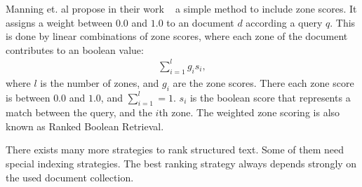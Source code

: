 Manning et. al propose in their work ~\cite{manning2008} a simple method to include zone scores. It assigns a weight between $0.0$ and $1.0$ to an document $d$ according a query $q$. This is done by linear combinations of zone scores, where each zone of the document contributes to an boolean value:
\begin{align}
  \sum_{i = 1}^{l}g_i s_i,
\end{align}
where $l$ is the number of zones, and $g_i$ are the zone scores. There each zone score is between $0.0$ and $1.0$, and $\sum_{i = 1}^l = 1$. $s_i$ is the boolean score that represents a match between the query, and the $i$th zone. The weighted zone scoring is also known as Ranked Boolean Retrieval. 

There exists many more strategies to rank structured text. Some of them need special indexing strategies. The best ranking strategy always depends strongly on the used document collection.









